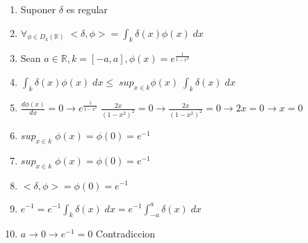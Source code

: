 \begin{enumerate}
	\item Suponer $\delta$ es regular
	\item $\forall_{\phi \in D_k(\mathbb{R})} \; <\delta, \phi> = \int_{k} \delta(x) \phi(x) \; dx$
	\item Sean $a \in \mathbb{R}, k=[-a, a], \phi(x) = e^{\frac{1}{1-x^2}}$
	\item $\int_{k} \delta(x) \phi(x) \; dx \leq  \; sup_{x \in k} \phi(x) \; \int_{k} \delta(x) \; dx$
	\item $\frac{d \phi(x)}{dx} = 0 \to e^{\frac{1}{1-x^2}} \; \frac{2x}{(1-x^2)^2} = 0 \to \frac{2x}{(1-x^2)^2} = 0 \to 2x = 0 \to x=0$
	\item $sup_{x \in k} \; \phi(x) = \phi(0) = e^{-1}$
	\item $sup_{x \in k} \; \phi(x) = \phi(0) = e^{-1}$
	\item $<\delta, \phi> = \phi(0) = e^{-1}$
	\item $e^{-1} = e^{-1} \int_{k} \delta(x) \; dx = e^{-1} \int_{-a}^{a} \delta(x) \; dx$
	\item $a \to 0 \to e^{-1} = 0$ Contradiccion
\end{enumerate}
